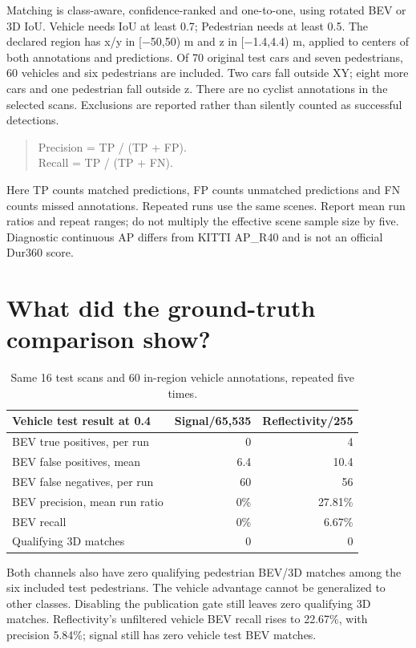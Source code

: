 \documentclass[11pt,a4paper]{article}
\begin{document}
Matching is class-aware, confidence-ranked and one-to-one, using rotated BEV or
3D IoU. Vehicle needs IoU at least 0.7; Pedestrian needs at least 0.5. The declared
region has x/y in [−50,50) m and z in [−1.4,4.4) m, applied to centers of both
annotations and predictions. Of 70 original test cars and seven pedestrians,
60 vehicles and six pedestrians are included. Two cars fall outside XY; eight
more cars and one pedestrian fall outside z. There are no cyclist annotations
in the selected scans. Exclusions are reported rather than silently counted as
successful detections.
\begin{quote}
Precision = TP / (TP + FP).\\
Recall = TP / (TP + FN).
\end{quote}
Here TP counts matched predictions, FP counts unmatched predictions and FN counts
missed annotations.
Repeated runs use the same scenes. Report mean run ratios and repeat ranges;
do not multiply the effective scene sample size by five. Diagnostic continuous
AP differs from KITTI AP\_R40 and is not an official Dur360 score.

\section{What did the ground-truth comparison show?}
\begin{table}[htbp]\centering
\begin{tabular}{@{}lrr@{}}
\toprule Vehicle test result at 0.4 & Signal/65,535 & Reflectivity/255 \\ \midrule
BEV true positives, per run & 0 & 4 \\
BEV false positives, mean & 6.4 & 10.4 \\
BEV false negatives, per run & 60 & 56 \\
BEV precision, mean run ratio & 0\% & 27.81\% \\
BEV recall & 0\% & 6.67\% \\
Qualifying 3D matches & 0 & 0 \\
\bottomrule
\end{tabular}
\caption{Same 16 test scans and 60 in-region vehicle annotations, repeated five times.}
\end{table}
Both channels also have zero qualifying pedestrian BEV/3D matches among the six
included test pedestrians. The vehicle advantage cannot be generalized to other
classes. Disabling the publication gate still leaves zero qualifying 3D matches.
Reflectivity's unfiltered vehicle BEV recall rises to 22.67\%, with precision
5.84\%; signal still has zero vehicle test BEV matches.
\end{document}
